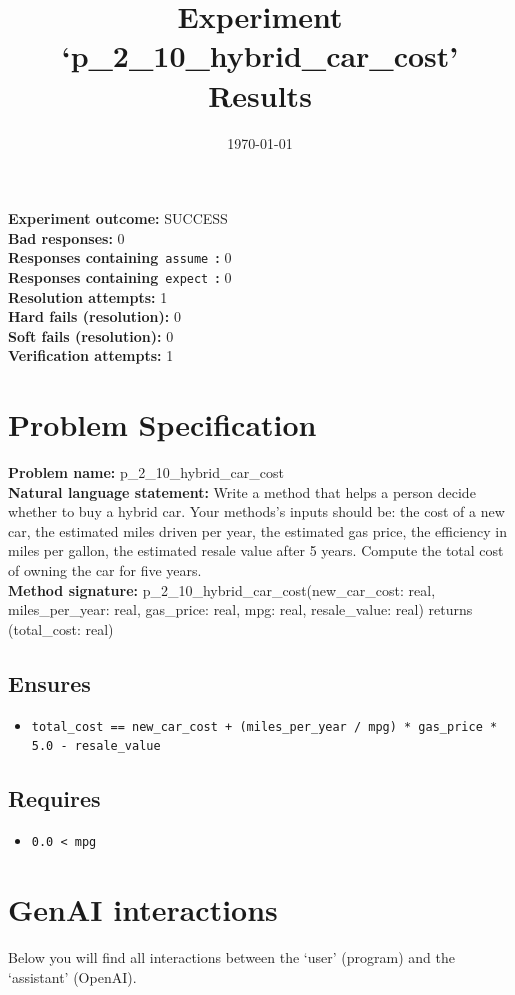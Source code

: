\documentclass{article}
\begin{document}
\title{Experiment `p\_2\_10\_hybrid\_car\_cost' Results}
\author{\today}
\date{}
\maketitle
\textbf{Experiment outcome: }SUCCESS
\\\textbf{Bad responses: }0
\\\textbf{Responses containing}~\texttt{assume}~\textbf{: }0
\\\textbf{Responses containing}~\texttt{expect}~\textbf{: }0
\\\textbf{Resolution attempts: }1
\\\textbf{Hard fails (resolution): }0
\\\textbf{Soft fails (resolution): }0
\\\textbf{Verification attempts: }1
\section*{Problem Specification}
\textbf{Problem name: }p\_2\_10\_hybrid\_car\_cost
\\\textbf{Natural language statement: }Write a method that helps a person decide whether to buy a hybrid car. Your methods's inputs should be: the cost of a new car, the estimated miles driven per year, the estimated gas price, the efficiency in miles per gallon, the estimated resale value after 5 years. Compute the total cost of owning the car for five years.
\\\textbf{Method signature: }p\_2\_10\_hybrid\_car\_cost(new\_car\_cost: real, miles\_per\_year: real, gas\_price: real, mpg: real, resale\_value: real) returns (total\_cost: real)
\subsection*{Ensures}
\begin{itemize}
\item \texttt{total\_cost == new\_car\_cost + (miles\_per\_year / mpg) * gas\_price * 5.0 - resale\_value}
\end{itemize}
\subsection*{Requires}
\begin{itemize}
\item \texttt{0.0 < mpg}
\end{itemize}
\clearpage
\section*{GenAI interactions}
Below you will find all interactions between the `user' (program) and the `assistant' (OpenAI).
\end{document}
